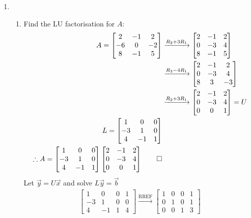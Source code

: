 \documentclass[12pt, a4paper]{article}
\begin{document}
\begin{enumerate}[Q\arabic*.]
  \item 
    \begin{enumerate}[(\alph*)]
      \item Find the LU factorisation for $A$:
        \begin{align*}
          A = \begin{bmatrix}2&-1&2\\-6&0&-2\\8&-1&5\end{bmatrix} &\xrightarrow{R_2+3R_1}
          \begin{bmatrix}2&-1&2\\0&-3&4\\8&-1&5\end{bmatrix} \\&\xrightarrow{R_3-4R_1}
          \begin{bmatrix}2&-1&2\\0&-3&4\\8&3&-3\end{bmatrix} \\&\xrightarrow{R_2+3R_1}
          \begin{bmatrix}2&-1&2\\0&-3&4\\0&0&1\end{bmatrix} = U \\
          L = \begin{bmatrix}1&0&0\\-3&1&0\\4&-1&1\end{bmatrix} \\
          \therefore A =  \begin{bmatrix}1&0&0\\-3&1&0\\4&-1&1\end{bmatrix}\begin{bmatrix}2&-1&2\\0&-3&4\\0&0&1\end{bmatrix} \qed 
        \end{align*}
        Let $\vec{y} = U \vec{x}$ and solve $L \vec{y} = \vec{b}$
        \begin{align*}
          \begin{bmatrix}1&0&0&1\\-3&1&0&0\\4&-1&1&4\end{bmatrix} \xrightarrow{\text{RREF}}
          \begin{bmatrix}1&0&0&1\\0&1&0&1\\0&0&1&3\end{bmatrix}

\end{align*}
\end{enumerate}
\end{enumerate}
\end{document}
